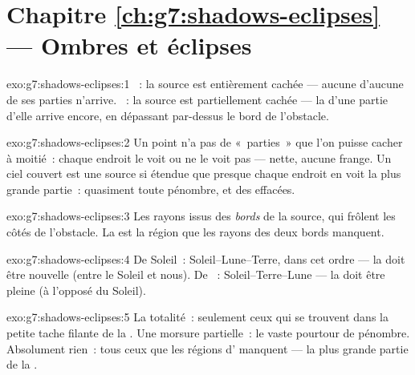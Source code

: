\section*{Chapitre \ref{ch:g7:shadows-eclipses} --- Ombres et éclipses}

\begin{solution}{exo:g7:shadows-eclipses:1}
~: la source est entièrement cachée --- aucune 
d'aucune de ses parties n'arrive. ~: la source est
partiellement cachée --- la  d'une partie d'elle arrive
encore, en dépassant par-dessus le bord de l'obstacle.
\end{solution}

\begin{solution}{exo:g7:shadows-eclipses:2}
Un point n'a pas de «~parties~» que l'on puisse cacher à moitié~:
chaque endroit le voit ou ne le voit pas ---  nette, aucune
frange. Un ciel couvert est une source si étendue que presque chaque
endroit en voit la plus grande partie~: quasiment toute pénombre, et
des  effacées.
\end{solution}

\begin{solution}{exo:g7:shadows-eclipses:3}
Les rayons issus des \emph{bords} de la source, qui frôlent les côtés
de l'obstacle. La  est la région que les rayons des deux
bords manquent.
\end{solution}

\begin{solution}{exo:g7:shadows-eclipses:4}
De Soleil~: Soleil--Lune--Terre, dans cet ordre --- la  doit être
nouvelle (entre le Soleil et nous). De ~: Soleil--Terre--Lune ---
la  doit être pleine (à l'opposé du Soleil).
\end{solution}

\begin{solution}{exo:g7:shadows-eclipses:5}
La totalité~: seulement ceux qui se trouvent dans la petite tache
filante de la . Une morsure partielle~: le vaste
pourtour de pénombre. Absolument rien~: tous ceux que les régions
d' manquent --- la plus grande partie de la .
\end{solution}

